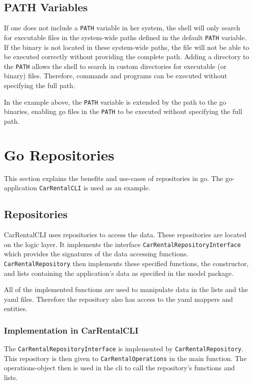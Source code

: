 \subsection{PATH Variables}
If one does not include a \texttt{PATH} variable in her system, the shell will only search for executable files in the system-wide paths defined in the default \texttt{PATH} variable.
If the binary is not located in these system-wide paths, the file will not be able to be executed correctly without providing the complete path.
Adding a directory to the \texttt{PATH} allows the shell to search in custom directories for executable (or binary) files.
Therefore, commands and programs can be executed without specifying the full path.

In the example above, the \texttt{PATH} variable is extended by the path to the go binaries, enabling go files in the \texttt{PATH} to be executed without specifying the full path.

\section{Go Repositories}
\label{sec:go_repositories}
This section explains the benefits and use-cases of repositories in go.
The go-application \texttt{CarRentalCLI} is used as an example.

\subsection{Repositories}
CarRentalCLI uses repositories to access the data.
These repositories are located on the logic layer.
It implements the interface \texttt{CarRentalRepositoryInterface} which provides the signatures of the data accessing functions.
\texttt{CarRentalRepository} then implements these specified functions, the constructor, and lists containing the application's data as specified in the model package.

All of the implemented functions are used to manipulate data in the lists and the yaml files.
Therefore the repository also has access to the yaml mappers and entities.

\subsubsection*{Implementation in CarRentalCLI}
The \texttt{CarRentalRepositoryInterface} is implemented by \texttt{CarRentalRepository}.
This repository is then given to \texttt{CarRentalOperations} in the main function.
The operations-object then is used in the cli to call the repository's functions and lists.

